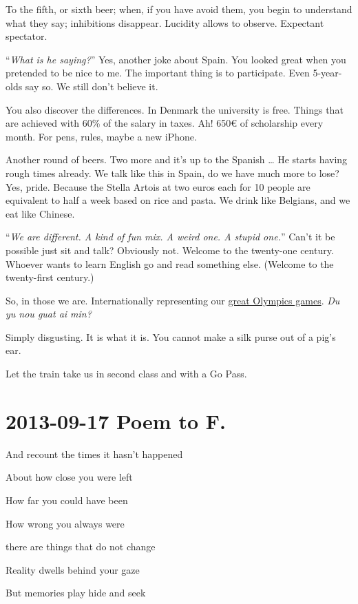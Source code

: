 \documentclass[]{book}
\begin{document}
To the fifth, or sixth beer; when, if you have avoid them, you begin to understand what they say; inhibitions disappear. Lucidity allows to observe. Expectant spectator.

``\emph{What is he saying?}'' Yes, another joke about Spain. You looked great when you pretended to be nice to me. The important thing is to participate. Even 5-year-olds say so. We still don't believe it.

You also discover the differences. In Denmark the university is free. Things that are achieved with 60\% of the salary in taxes. Ah! 650€ of scholarship every month. For pens, rules, maybe a new iPhone.

Another round of beers. Two more and it's up to the Spanish \ldots{} He starts having rough times already. We talk like this in Spain, do we have much more to lose? Yes, pride. Because the Stella Artois at two euros each for 10 people are equivalent to half a week based on rice and pasta. We drink like Belgians, and we eat like Chinese.

``\emph{We are different. A kind of fun mix. A weird one. A stupid one.}'' Can't it be possible just sit and talk? Obviously not. Welcome to the twenty-one century. Whoever wants to learn English go and read something else. (Welcome to the twenty-first century.)

So, in those we are. Internationally representing our \href{https://www.youtube.com/watch?v=tctViHyZeJY}{great Olympics games}. \emph{Du yu nou guat ai min?}

Simply disgusting. It is what it is. You cannot make a silk purse out of a pig's ear.

Let the train take us in second class and with a Go Pass.

\hypertarget{toF20130917}{%
\section*{2013-09-17 Poem to F.}\label{toF20130917}}

And recount the times it hasn't happened

About how close you were left

How far you could have been

How wrong you always were

there are things that do not change

Reality dwells behind your gaze

But memories play hide and seek
\end{document}
